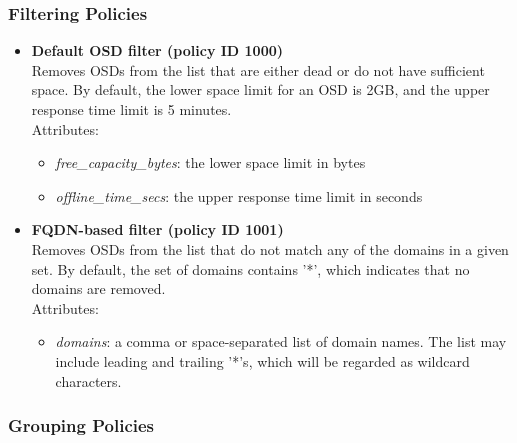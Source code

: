 \documentclass[a4paper,10pt]{book}
\begin{document}
\subsubsection{Filtering Policies}
\begin{itemize}

 \item \textbf{Default OSD filter (policy ID 1000)}\\
 Removes OSDs from the list that are either dead or do not have sufficient space. By default, the lower space limit for an OSD is 2GB, and the upper response time limit is 5 minutes.\\

 Attributes:
 \begin{itemize}
 \item \emph{free\_capacity\_bytes}: the lower space limit in bytes
 \item \emph{offline\_time\_secs}: the upper response time limit in seconds
 \end{itemize}

 \item \textbf{FQDN-based filter (policy ID 1001)}\\
 Removes OSDs from the list that do not match any of the domains in a given set. By default, the set of domains contains '*', which indicates that no domains are removed.\\

 Attributes:
 \begin{itemize}
 \item \emph{domains}: a comma or space-separated list of domain names. The list may include leading and trailing '*'s, which will be regarded as wildcard characters.
\end{itemize}

\end{itemize}

\subsubsection{Grouping Policies}
\end{document}
